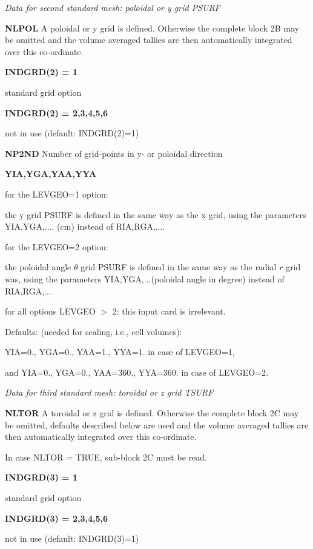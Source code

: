 {\sl Data for second standard mesh: poloidal or y grid PSURF}
\begin{list}{ }{}
\item[{\bf NLPOL }]
A poloidal or y grid is defined. Otherwise the complete block 2B
may be omitted and the volume averaged tallies are then automatically
integrated over this co-ordinate.
\item[{\bf INDGRD(2) = 1 }] ~

standard grid option
\item[{\bf INDGRD(2) = 2,3,4,5,6 }] ~

not in use  (default: INDGRD(2)=1)
\item[{\bf NP2ND }]
Number of grid-points in y- or poloidal direction
\item[{\bf YIA,YGA,YAA,YYA }] ~

\begin{list}{ }{}
\item[ for the LEVGEO=1 option: ] ~

the y grid PSURF is defined in the same way as the x grid, using the
parameters YIA,YGA,.... (cm) instead of RIA,RGA,....

\item[ for the LEVGEO=2 option: ] ~

the poloidal angle $\theta$ grid PSURF is defined in the same way as the radial $r$ grid was,
using
the parameters YIA,YGA,...(poloidal angle in degree) instead of RIA,RGA,...

for all options LEVGEO $>$ 2:
this input card is irrelevant.
\end{list}
Defaults: (needed for scaling, i.e., cell volumes):

YIA=0., YGA=0., YAA=1., YYA=1. in case of LEVGEO=1,

and YIA=0., YGA=0., YAA=360., YYA=360. in case of LEVGEO=2.

\end{list}
\medskip
{\sl Data for third standard mesh: toroidal or z grid TSURF}
\begin{list}{ }{}
\item[{\bf NLTOR }]
A toroidal or z grid is defined. Otherwise the complete block 2C
may be omitted, defaults described below are used and the volume averaged tallies are then automatically
integrated over this co-ordinate.

In case NLTOR = TRUE, sub-block 2C must be read.
\item[{\bf INDGRD(3) = 1 }] ~

standard grid option
\item[{\bf INDGRD(3) = 2,3,4,5,6 }] ~

not in use (default: INDGRD(3)=1)
\end{list}
